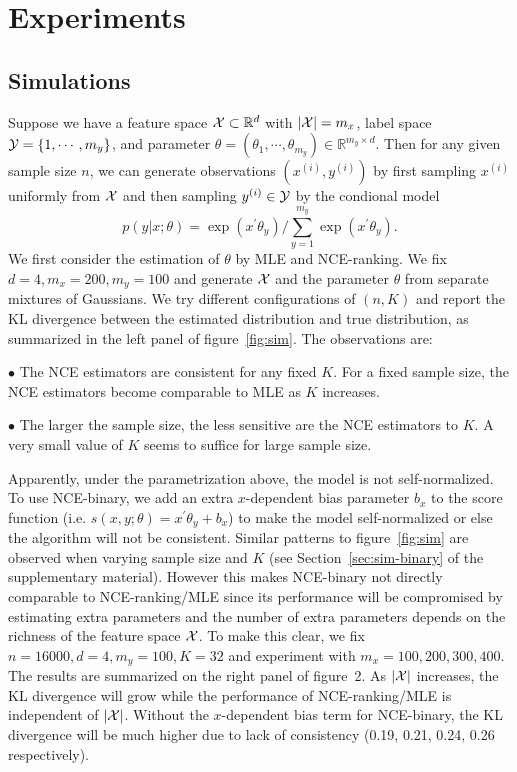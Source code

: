 \documentclass[11pt,a4paper]{article}
\begin{document}
\section{Experiments}


\subsection{Simulations}
Suppose we have a feature space ${\cal X} \subset \mathbb{R}^d$ with $|{\cal X}| = m_x$, label space ${\cal Y} = \{1, \cdots, m_y \}$, and parameter $\theta = (\theta_1, \cdots, \theta_{m_y}) \in \mathbb{R}^{m_y\times d}$. Then for any given sample size $n$, we can generate observations ${(x^{(i)}, y^{(i)})}$ by first sampling $x^{(i)}$ uniformly from ${\cal X}$ and then sampling $y^{(i)}\in{\cal Y}$ by the condional model
\[
  p(y|x; \theta) = \exp(x^\prime \theta_y) / \sum_{y=1}^{m_y} \exp(x^\prime \theta_y).
\]
We first consider the estimation of $\theta$ by MLE and
NCE-ranking. We fix $d=4, m_x=200, m_y=100$ and generate ${\cal X}$
and the parameter $\theta$ from separate mixtures of Gaussians. We try different
configurations of $(n, K)$ and report the KL divergence between the
estimated distribution and true distribution, as summarized in the
left panel of figure~\ref{fig:sim}. The observations are:

$\bullet$ The NCE estimators are consistent for any fixed $K$. For a fixed sample size, the NCE estimators become comparable to MLE as $K$ increases. 

$\bullet$ The larger the sample size, the less sensitive are the NCE estimators to $K$. A very small value of $K$ seems to suffice for large sample size. 


Apparently, under the parametrization above, the model is not self-normalized. To use NCE-binary, we add an extra $x$-dependent bias parameter $b_x$ to the score function (i.e. $s(x, y; \theta) = x^\prime\theta_y + b_x$) to make the model self-normalized or else the algorithm will not be consistent. Similar patterns to figure~\ref{fig:sim} are observed when varying sample size and $K$ (see Section~\ref{sec:sim-binary} of the supplementary material). However this makes NCE-binary not directly comparable to NCE-ranking/MLE since its performance will be compromised by estimating extra parameters and the number of extra parameters depends on the richness of the feature space ${\cal X}$. 
 To make this clear, we fix $n=16000, d=4, m_y=100, K=32$ and experiment with $m_x = 100, 200, 300, 400$. The results are summarized on the right panel of figure~2. As $|{\cal X}|$ increases, the KL divergence will grow while the performance of NCE-ranking/MLE is independent of $|{\cal X}|$. Without the $x$-dependent bias term for NCE-binary, the KL divergence will be much higher due to lack of consistency (0.19, 0.21, 0.24, 0.26 respectively). 
\end{document}
